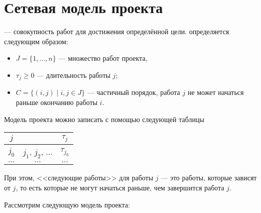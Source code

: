 \section{Сетевая модель проекта}


 --- совокупность работ для достижения определённой цели.  определяется следующим образом:

\begin{itemize}[nosep]
	\item $J = \{1, \dots, n\}$ --- множество работ проекта,
	
	\item $\tau_{j} \ge 0$ --- длительность работы $j$;
	
	\item $C = \big\{(i, j) \; \big| \; i,j \in J\big\}$ --- частичный порядок, работа $j$ не может начаться раньше окончанию работы $i$.
\end{itemize}

Модель проекта можно записать с помощью следующей таблицы

\begin{table}[H]
	\centering
	\begin{tabular}{ | c | c | c | } 
		\hline
		$j$ & \text{следующие работы} & $\tau_j$ \\ \hline
		$j_0$ & $j_1$, $j_2$, $\dots$ & $\tau_{j_0}$ \\ \hline
		$\dots$ & $\dots$ & $\dots$ \\ \hline
	\end{tabular}
\end{table}

При этом, <<следующие работы>> для работы $j$ --- это работы, которые зависят от $j$, то есть которые не могут начаться раньше, чем завершится работа $j$.

\example\label{ex:office_project}

Рассмотрим следующую модель проекта:

